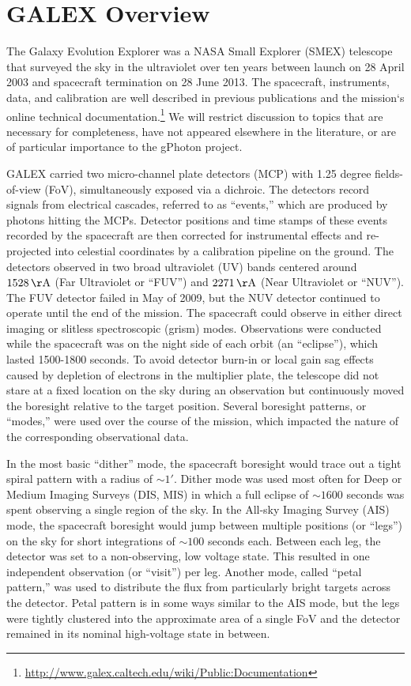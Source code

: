 \documentclass[iop]{emulateapj}
\begin{document}
\section{GALEX Overview}
The Galaxy Evolution Explorer \citep{mar2005} was a NASA Small Explorer (SMEX) telescope that surveyed the sky in the ultraviolet over ten years between launch on 28 April 2003 and spacecraft termination on 28 June 2013. The spacecraft, instruments, data, and calibration are well described in previous publications \citep{mor2005,mor2007} and the mission`s online technical documentation.\footnote{\url{http://www.galex.caltech.edu/wiki/Public:Documentation}} We will restrict discussion to topics that are necessary for completeness, have not appeared elsewhere in the literature, or are of particular importance to the gPhoton project.

GALEX carried two micro-channel plate detectors (MCP) with 1.25 degree fields-of-view (FoV), simultaneously exposed via a dichroic. The detectors record signals from electrical cascades, referred to as ``events,'' which are produced by photons hitting the MCPs. Detector positions and time stamps of these events recorded by the spacecraft are then corrected for instrumental effects and re-projected into celestial coordinates by a calibration pipeline on the ground. The detectors observed in two broad ultraviolet (UV) bands centered around $1528\,\rm{\AA}$ (Far Ultraviolet or ``FUV'') and $2271\,\rm{\AA}$ (Near Ultraviolet or ``NUV''). The FUV detector failed in May of 2009, but the NUV detector continued to operate until the end of the mission. The spacecraft could observe in either direct imaging or slitless spectroscopic (grism) modes. Observations were conducted while the spacecraft was on the night side of each orbit (an ``eclipse''), which lasted 1500-1800 seconds. To avoid detector burn-in or local gain sag effects caused by depletion of electrons in the multiplier plate, the telescope did not stare at a fixed location on the sky during an observation but continuously moved the boresight relative to the target position. Several boresight patterns, or ``modes,'' were used over the course of the mission, which impacted the nature of the corresponding observational data.

In the most basic ``dither'' mode, the spacecraft boresight would trace out a tight spiral pattern with a radius of $\sim1'$. Dither mode was used most often for Deep or Medium Imaging Surveys (DIS, MIS) in which a full eclipse of $\sim1600$ seconds was spent observing a single region of the sky. In the All-sky Imaging Survey (AIS) mode, the spacecraft boresight would jump between multiple positions (or ``legs'') on the sky for short integrations of $\sim100$ seconds each. Between each leg, the detector was set to a non-observing, low voltage state. This resulted in one independent observation (or ``visit'') per leg. Another mode, called ``petal pattern,'' was used to distribute the flux from particularly bright targets across the detector. Petal pattern is in some ways similar to the AIS mode, but the legs were tightly clustered into the approximate area of a single FoV and the detector remained in its nominal high-voltage state in between.
\end{document}
